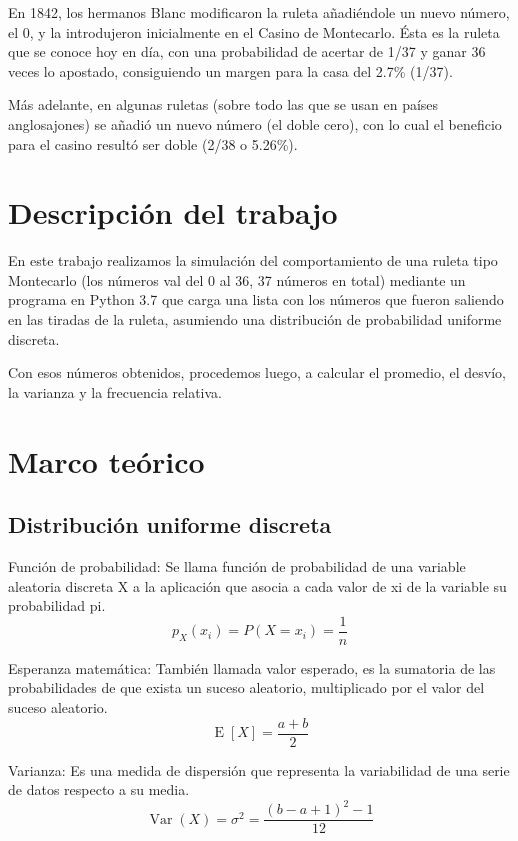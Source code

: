 En 1842, los hermanos Blanc modificaron la ruleta añadiéndole un nuevo número, el 0, y la introdujeron inicialmente en el Casino de Montecarlo. Ésta es la ruleta que se conoce hoy en día, con una probabilidad de acertar de 1/37 y ganar 36 veces lo apostado, consiguiendo un margen para la casa del 2.7\% (1/37).

Más adelante, en algunas ruletas (sobre todo las que se usan en países anglosajones) se añadió un nuevo número (el doble cero), con lo cual el beneficio para el casino resultó ser doble (2/38 o 5.26\%).

\section{Descripción del trabajo}
\label{sec:headings}
En este trabajo realizamos la simulación del comportamiento de una ruleta tipo Montecarlo (los números val del 0 al 36, 37 números en total) mediante un programa en Python 3.7 que carga una lista con los números que fueron saliendo en las tiradas de la ruleta, asumiendo una distribución de probabilidad uniforme discreta.

Con esos números obtenidos, procedemos luego, a calcular el promedio, el desvío, la varianza y la frecuencia relativa.

\section{Marco teórico}
\subsection{Distribución uniforme discreta}
Función de probabilidad:
Se llama función de probabilidad de una variable aleatoria discreta X a la aplicación que asocia a cada valor de xi de la variable su probabilidad pi.
\begin{equation}
p_X(x_i) = P(X = x_i) = \frac{1}{n}
\end{equation}

Esperanza matemática:
También llamada valor esperado, es la sumatoria de las probabilidades de que exista un suceso aleatorio, multiplicado por el valor del suceso aleatorio.
\begin{equation}
\operatorname{E}[X] = \frac{a+b}{2}
\end{equation}

Varianza:
Es una medida de dispersión que representa la variabilidad de una serie de datos respecto a su media.
\begin{equation}
\operatorname{Var}(X) = \sigma^{2} = \frac{(b-a+1)^{2}-1}{12}
\end{equation}

